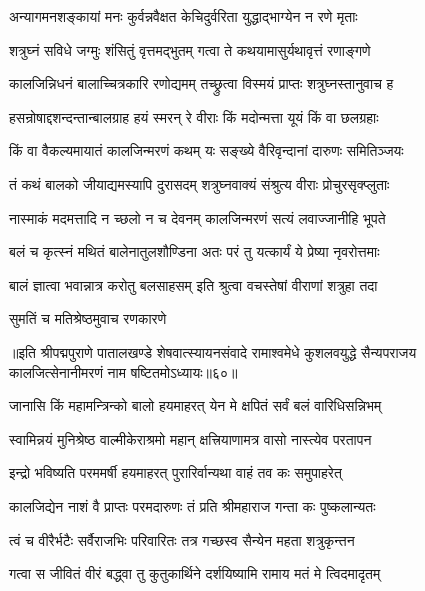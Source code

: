 \twolineshloka
{अन्यागमनशङ्कायां मनः कुर्वन्नवैक्षत}
{केचिदुर्वरिता युद्धाद्भाग्येन न रणे मृताः}%

\twolineshloka
{शत्रुघ्नं सविधे जग्मुः शंसितुं वृत्तमद्भुतम्}
{गत्वा ते कथयामासुर्यथावृत्तं रणाङ्गणे}%

\twolineshloka
{कालजिन्निधनं बालाच्चित्रकारि रणोद्यमम्}
{तच्छ्रुत्वा विस्मयं प्राप्तः शत्रुघ्नस्तानुवाच ह}%

\twolineshloka
{हसन्रोषाद्दशन्दन्तान्बालग्राह हयं स्मरन्}
{रे वीराः किं मदोन्मत्ता यूयं किं वा छलग्रहाः}%

\twolineshloka
{किं वा वैकल्यमायातं कालजिन्मरणं कथम्}
{यः सङ्ख्ये वैरिवृन्दानां दारुणः समितिञ्जयः}%

\twolineshloka
{तं कथं बालको जीयाद्यमस्यापि दुरासदम्}
{शत्रुघ्नवाक्यं संश्रुत्य वीराः प्रोचुरसृक्प्लुताः}%

\twolineshloka
{नास्माकं मदमत्तादि न च्छलो न च देवनम्}
{कालजिन्मरणं सत्यं लवाज्जानीहि भूपते}%

\twolineshloka
{बलं च कृत्स्नं मथितं बालेनातुलशौण्डिना}
{अतः परं तु यत्कार्यं ये प्रेष्या नृवरोत्तमाः}%

\twolineshloka
{बालं ज्ञात्वा भवान्नात्र करोतु बलसाहसम्}
{इति श्रुत्वा वचस्तेषां वीराणां शत्रुहा तदा}%

\onelineshloka
{सुमतिं च मतिश्रेष्ठमुवाच रणकारणे}%

{॥इति श्रीपद्मपुराणे पातालखण्डे शेषवात्स्यायनसंवादे रामाश्वमेधे कुशलवयुद्धे सैन्यपराजय कालजित्सेनानीमरणं नाम षष्टितमोऽध्यायः॥६०॥}

\resetShloka


\twolineshloka
{जानासि किं महामन्त्रिन्को बालो हयमाहरत्}
{येन मे क्षपितं सर्वं बलं वारिधिसन्निभम्}%


\twolineshloka
{स्वामिन्नयं मुनिश्रेष्ठ वाल्मीकेराश्रमो महान्}
{क्षत्त्रियाणामत्र वासो नास्त्येव परतापन}%

\twolineshloka
{इन्द्रो भविष्यति परममर्षी हयमाहरत्}
{पुरारिर्वान्यथा वाहं तव कः समुपाहरेत्}%

\twolineshloka
{कालजिद्येन नाशं वै प्राप्तः परमदारुणः}
{तं प्रति श्रीमहाराज गन्ता कः पुष्कलान्यतः}%

\twolineshloka
{त्वं च वीरैर्भटैः सर्वैराजभिः परिवारितः}
{तत्र गच्छस्व सैन्येन महता शत्रुकृन्तन}%

\twolineshloka
{गत्वा स जीवितं वीरं बद्ध्वा तु कुतुकार्थिने}
{दर्शयिष्यामि रामाय मतं मे त्विदमादृतम्}%

